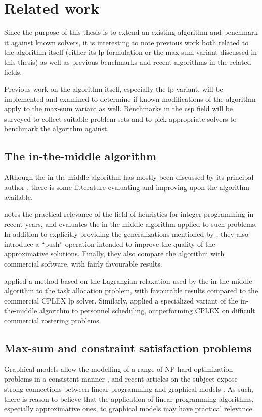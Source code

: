 \section{Related work}
Since the purpose of this thesis is to extend an existing algorithm and benchmark it against known solvers, it is interesting to note previous work both related to the algorithm itself (either its \gls{lp} formulation or the max-sum variant discussed in this thesis) as well as previous benchmarks and recent algorithms in the related fields.

Previous work on the algorithm itself, especially the \gls{lp} variant, will be implemented and examined to determine if known modifications of the algorithm apply to the max-sum variant as well.
Benchmarks in the \gls{csp} field will be surveyed to collect suitable problem sets and to pick appropriate solvers to benchmark the algorithm against.

\subsection{The in-the-middle algorithm}
Although the in-the-middle algorithm has mostly been discussed by its principal author \parencites{Wedelin95}{Wedelin08}{Wedelin13}{Alefragis00}, there is some litterature evaluating and improving upon the algorithm available.

\Textcite{Bastert10} notes the practical relevance of the field of heuristics for integer programming in recent years, and evaluates the in-the-middle algorithm applied to such problems. In addition to explicitly providing the generalizations mentioned by \textcite{Wedelin95}, they also introduce a \enquote{push} operation intended to improve the quality of the approximative solutions. Finally, they also compare the algorithm with commercial software, with fairly favourable results.

\Textcite{Ernst05} applied a method based on the Lagrangian relaxation used by the in-the-middle algorithm to the task allocation problem, with favourable results compared to the commercial CPLEX \gls{lp} solver.
Similarly, \textcite{Mason01} applied a specialized variant of the in-the-middle algorithm to personnel scheduling, outperforming CPLEX on difficult commercial rostering problems.

\subsection{Max-sum and constraint satisfaction problems}
Graphical models allow the modelling of a range of NP-hard optimization problems in a consistent manner \parencite{deGivry14}, and recent articles on the subject expose strong connections between linear programming and graphical models \parencites{Werner07}{Kolmogorov13}.
As such, there is reason to believe that the application of linear programming algorithms, especially approximative ones, to graphical models may have practical relevance.

